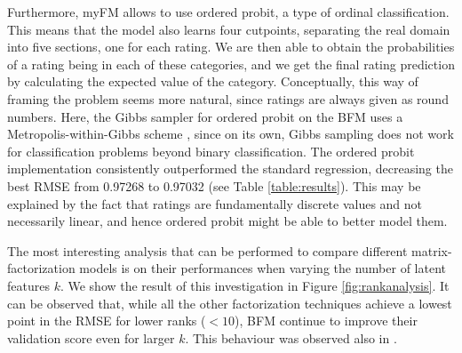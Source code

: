 \documentclass[sigconf]{acmart}
\begin{document}
Furthermore, myFM allows to use ordered probit, a type of ordinal classification.%
This means that the model also learns four cutpoints, separating the real domain into five sections, one for each rating.
We are then able to obtain the probabilities of a rating being in each of these categories, and we get the final rating prediction by calculating the expected value of the category. Conceptually, this way of framing the problem seems more natural, since ratings are always given as round numbers. Here, the Gibbs sampler for ordered probit on the BFM uses a Metropolis-within-Gibbs scheme \cite{myFM}, since on its own, Gibbs sampling does not work for classification problems beyond binary classification. 
The ordered probit implementation consistently outperformed the standard regression, decreasing the best RMSE from 0.97268 to 0.97032 (see Table \ref{table:results}). 
This may be explained by the fact that ratings are fundamentally discrete values and not necessarily linear, and hence ordered probit might be able to better model them.


The most interesting analysis that can be performed to compare different matrix-factorization models is on their performances when varying the number of latent features $k$.
We show the result of this investigation in Figure \ref{fig:rankanalysis}. 
It can be observed that, while all the other factorization techniques achieve a lowest point in the RMSE for lower ranks ($<10$), 
BFM continue to improve their validation score even for larger $k$. 
This behaviour was observed also in \cite{onthediffic}.
\end{document}
